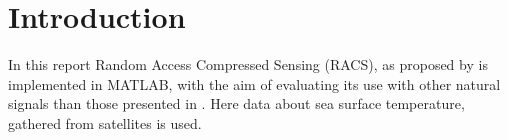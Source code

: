 \documentclass[Main]{subfiles}
\begin{document}
\section{Introduction} %
\label{sec:introduction}
	In this report Random Access Compressed Sensing (RACS), as proposed by  is implemented in MATLAB, with the aim of evaluating its use with other natural signals than those presented in .
	Here data about sea surface temperature, gathered from satellites is used.



\end{document}
